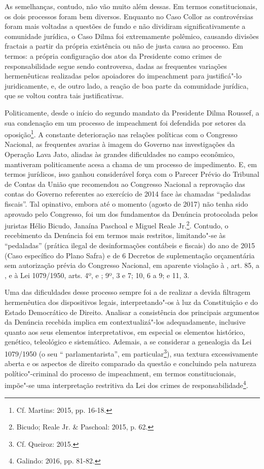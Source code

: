 As semelhanças, contudo, não vão muito além dessas. Em termos
constitucionais, os dois processos foram bem diversos. Enquanto no Caso
Collor as controvérsias foram mais voltadas a questões de fundo e não
dividiram significativamente a comunidade jurídica, o Caso Dilma foi
extremamente polêmico, causando divisões fractais a partir da própria
existência ou não de justa causa ao processo. Em termos: a própria
configuração dos atos da Presidente como crimes de responsabilidade
segue sendo controversa, dadas as frequentes variações hermenêuticas
realizadas pelos apoiadores do impeachment para justificá"-lo
juridicamente, e, de outro lado, a reação de boa parte da comunidade
jurídica, que se voltou contra tais justificativas.

Politicamente, desde o início do segundo mandato da Presidente Dilma
Roussef, a sua condenação em um processo de impeachment foi
defendida por setores da oposição\footnote{Cf. Martins: 2015, pp. 16-18.}. A
constante deterioração nas relações políticas com o Congresso Nacional,
as frequentes avarias à imagem do Governo nas investigações da Operação
Lava Jato, aliadas às grandes dificuldades no campo econômico,
mantiveram politicamente acesa a chama de um processo de impedimento. E,
em termos jurídicos, isso ganhou considerável força com o Parecer Prévio
do Tribunal de Contas da União que recomendou ao Congresso Nacional a
reprovação das contas do Governo referentes ao exercício de 2014 face às
chamadas ``pedaladas fiscais''. Tal opinativo, embora até o momento
(agosto de 2017) não tenha sido aprovado pelo Congresso, foi um dos
fundamentos da Denúncia protocolada pelos juristas Hélio Bicudo, Janaína
Paschoal e Miguel Reale Jr.\footnote{Bicudo; Reale Jr. \& Paschoal: 2015, p.
62.}. Contudo, o recebimento da Denúncia foi em termos mais restritos,
limitando"-se às ``pedaladas'' (prática ilegal de desinformações
contábeis e fiscais) do ano de 2015 (Caso específico do Plano Safra) e
de 6 Decretos de suplementação orçamentária sem autorização prévia do
Congresso Nacional, em aparente violação à , art. 85,  a , e à Lei
1079/1950, arts. 4º,  e ; 9º, 3 e 7; 10, 6 a 9; e 11, 3.

Uma das dificuldades desse processo sempre foi a de realizar a devida
filtragem hermenêutica dos dispositivos legais, interpretando"-os à luz
da Constituição e do Estado Democrático de Direito. Analisar a
consistência dos principais argumentos da Denúncia recebida implica em
contextualizá"-los adequadamente, inclusive quanto aos seus elementos
interpretativos, em especial os elementos histórico, genético,
teleológico e sistemático. Ademais, a se considerar a genealogia da Lei
1079/1950 (o seu `` parlamentarista'', em particular\footnote{Cf. Queiroz:
2015.}), sua textura excessivamente aberta e os aspectos de direito
comparado da questão e concluindo pela natureza político"-criminal do
processo de impeachment, em termos constitucionais, impõe"-se uma
interpretação restritiva da Lei dos crimes de responsabilidade\footnote{Galindo:
2016, pp. 81-82.}.


